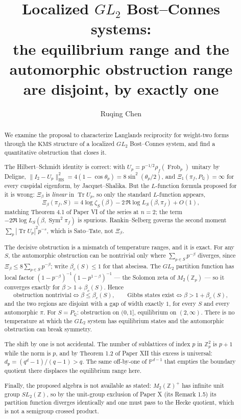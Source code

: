 \documentclass[11pt]{amsart}
\title[The gap is exactly one]{Localized $GL_2$ Bost--Connes systems:\\ the equilibrium range and the automorphic obstruction range\\ are disjoint, by exactly one}
\author{Ruqing Chen}
\date{}
\numberwithin{equation}{section}
\theoremstyle{definition}
\theoremstyle{remark}
\newcommand{\Z}{\mathbb{Z}}
\newcommand{\Q}{\mathbb{Q}}
\newcommand{\pp}{\mathfrak{p}}
\newcommand{\Tr}{\operatorname{Tr}}
\newcommand{\HS}{\mathrm{HS}}
\newcommand{\Sym}{\operatorname{Sym}}
\newcommand{\Frob}{\operatorname{Frob}}
\begin{document}
\begin{abstract}
We examine the proposal to characterize Langlands reciprocity for weight-two forms through
the $\mathrm{KMS}$ structure of a localized $GL_2$ Bost--Connes system, and find a
quantitative obstruction that closes it.

The Hilbert--Schmidt identity is correct: with $U_p=p^{-1/2}\rho_f(\Frob_p)$ unitary by
Deligne, $\|I_2-U_p\|_\HS^2=4(1-\cos\theta_p)=8\sin^2(\theta_p/2)$, and
$\Xi_1(\pi_f,P_\Q)=\infty$ for every cuspidal eigenform, by Jacquet--Shalika. But the
$L$-function formula proposed for it is wrong: $\Xi_\beta$ is \emph{linear} in $\Tr U_p$, so
only the standard $L$-function appears,
\[
\Xi_\beta(\pi_f,S)=4\log\zeta_S(\beta)-2\,\Re\log L_S(\beta,\pi_f)+O(1),
\]
matching Theorem 4.1 of Paper VI of the series at $n=2$; the term
$-2\Re\log L_S(\beta,\Sym^2\pi_f)$ is
spurious. Rankin--Selberg governs the second moment $\sum_p|\Tr U_p|^2p^{-s}$, which is
Sato--Tate, not $\Xi_\beta$.

The decisive obstruction is a mismatch of temperature ranges, and it is exact. For any
$S$, the automorphic obstruction can be nontrivial only where $\sum_{p\in S}p^{-\beta}$
diverges, since $\Xi_\beta\le8\sum_{p\in S}p^{-\beta}$; write $\beta_c(S)\le1$ for that
abscissa. The $GL_2$ partition function has local factor
$(1-p^{-\beta})^{-1}(1-p^{1-\beta})^{-1}$ --- the Solomon zeta of $M_2(\Z_p)$ --- so it
converges exactly for $\beta>1+\beta_c(S)$. Hence
\[
\text{obstruction nontrivial}\iff\beta\le\beta_c(S),
\qquad
\text{Gibbs states exist}\iff\beta>1+\beta_c(S),
\]
and the two regions are disjoint with a gap of width exactly $1$, for every $S$ and every
automorphic $\pi$. For $S=P_\Q$: obstruction on $(0,1]$, equilibrium on $(2,\infty)$. There is
no temperature at which the $GL_2$ system has equilibrium states and the automorphic
obstruction can break symmetry.

The shift by one is not accidental. The number of sublattices of index $p$ in $\Z_p^2$ is
$p+1$ while the norm is $p$, and by Theorem 1.2 of Paper XII this excess is universal:
$d_\pp=(q^d-1)/(q-1)>q$. The same off-by-one of $\mathbb P^{d-1}$ that empties the boundary
quotient there displaces the equilibrium range here.

Finally, the proposed algebra is not available as stated: $M_2(\Z)^+$ has infinite unit group
$SL_2(\Z)$, so by the unit-group exclusion of Paper X (its Remark 1.5) its partition function
diverges identically and one
must pass to the Hecke quotient, which is not a semigroup crossed product.
\end{abstract}
\end{document}
